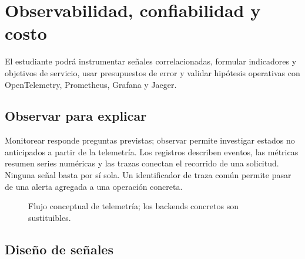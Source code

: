 \chapter{Observabilidad, confiabilidad y costo}
\label{chap:observabilidad}

\begin{objetivos}
El estudiante podrá instrumentar señales correlacionadas, formular indicadores y objetivos de servicio, usar presupuestos de error y validar hipótesis operativas con OpenTelemetry, Prometheus, Grafana y Jaeger.
\end{objetivos}

\section{Observar para explicar}

Monitorear responde preguntas previstas; observar permite investigar estados no anticipados a partir de la telemetría. Los registros describen eventos, las métricas resumen series numéricas y las trazas conectan el recorrido de una solicitud. Ninguna señal basta por sí sola. Un identificador de traza común permite pasar de una alerta agregada a una operación concreta.

\begin{figure}[htbp]
\centering
{}
\caption{Flujo conceptual de telemetría; los backends concretos son sustituibles.}
\end{figure}

\section{Diseño de señales}

